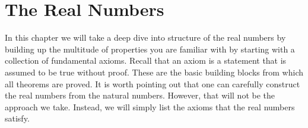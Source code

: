 \chapter{The Real Numbers}\label{chap:RealNumbers}


In this chapter we will take a deep dive into structure of the real numbers by building up the multitude of properties you are familiar with by starting with a collection of fundamental axioms. Recall that an axiom is a statement that is assumed to be true without proof. These are the basic building blocks from which all theorems are proved. It is worth pointing out that one can carefully construct the real numbers from the natural numbers.  However, that will not be the approach we take.  Instead, we will simply list the axioms that the real numbers satisfy.   